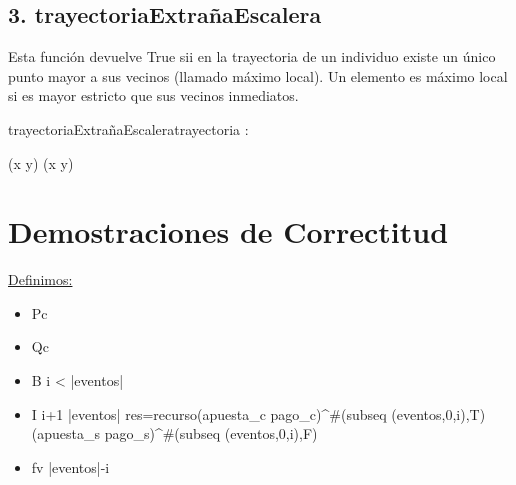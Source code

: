 \documentclass[10pt,a4paper]{article}
\begin{document}
	\subsection*{3. trayectoriaExtrañaEscalera}
	Esta función devuelve True sii en la trayectoria de un individuo existe un único punto mayor a sus vecinos (llamado máximo local). Un elemento es máximo local si es mayor estricto que sus vecinos inmediatos.



	\begin{proc}{trayectoriaExtrañaEscalera}{\In trayectoria : \TLista{\float}}{\bool}
		
		\hfill





		{(x \wedge \neg y) \lor (\neg x \wedge y)}

	\end{proc}

\section{Demostraciones de Correctitud}

\underline{Definimos:}

\begin{itemize} 
    \item Pc 

    \item Qc 

    \item B \equiv i < |eventos|

    \item I  \leq i+1 \leq |eventos| \yLuego res=recurso(apuesta_c pago_c)^{\#(subseq (eventos,0,i),T)} (apuesta_s pago_s)^{\#(subseq (eventos,0,i),F)}

    \item fv \equiv |eventos|-i
\end{itemize}
\end{document}
